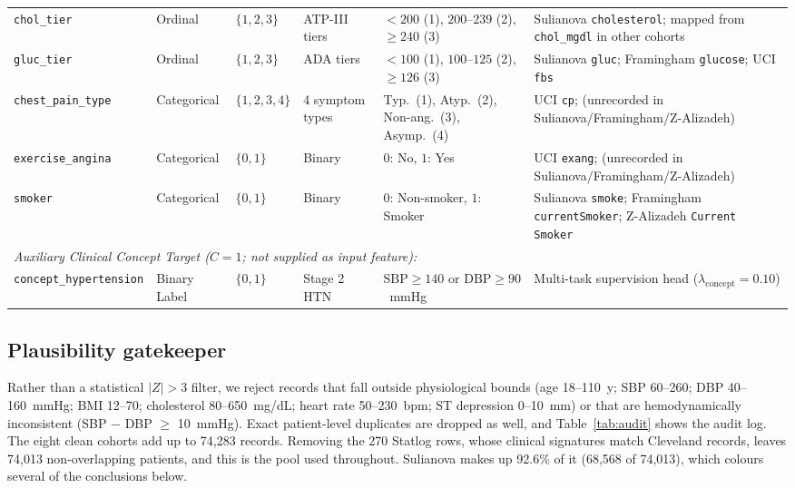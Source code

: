 \documentclass[conference]{IEEEtran}
\begin{document}
\begin{table}[t]
{\begin{tabular}{lllllp{4.6cm}}
\texttt{chol\_tier} & Ordinal & $\{1, 2, 3\}$ & ATP-III tiers & $<200$ (1), $200$--$239$ (2), $\ge 240$ (3) & Sulianova \texttt{cholesterol}; mapped from \texttt{chol\_mgdl} in other cohorts\\
\texttt{gluc\_tier} & Ordinal & $\{1, 2, 3\}$ & ADA tiers & $<100$ (1), $100$--$125$ (2), $\ge 126$ (3) & Sulianova \texttt{gluc}; Framingham \texttt{glucose}; UCI \texttt{fbs}\\
\texttt{chest\_pain\_type} & Categorical & $\{1, 2, 3, 4\}$ & 4 symptom types & Typ.\ (1), Atyp.\ (2), Non-ang.\ (3), Asymp.\ (4) & UCI \texttt{cp}; (unrecorded in Sulianova/Framingham/Z-Alizadeh)\\
\texttt{exercise\_angina} & Categorical & $\{0, 1\}$ & Binary & $0$: No, $1$: Yes & UCI \texttt{exang}; (unrecorded in Sulianova/Framingham/Z-Alizadeh)\\
\texttt{smoker} & Categorical & $\{0, 1\}$ & Binary & $0$: Non-smoker, $1$: Smoker & Sulianova \texttt{smoke}; Framingham \texttt{currentSmoker}; Z-Alizadeh \texttt{Current Smoker}\\
\midrule
\multicolumn{6}{l}{\emph{Auxiliary Clinical Concept Target ($C=1$; not supplied as input feature):}}\\
\texttt{concept\_hypertension} & Binary Label & $\{0, 1\}$ & Stage 2 HTN & $\mathrm{SBP}\ge 140$ or $\mathrm{DBP}\ge 90$~mmHg & Multi-task supervision head ($\lambda_{\mathrm{concept}}=0.10$)\\
\bottomrule
\end{tabular}}
\end{table}

\subsection{Plausibility gatekeeper}
Rather than a statistical $|Z|>3$ filter, we reject records that fall outside physiological bounds (age 18--110~y; SBP 60--260; DBP 40--160~mmHg; BMI 12--70; cholesterol 80--650~mg/dL; heart rate 50--230~bpm; ST depression 0--10~mm) or that are hemodynamically inconsistent (SBP $-$ DBP $\ge$ 10~mmHg). Exact patient-level duplicates are dropped as well, and Table~\ref{tab:audit} shows the audit log. The eight clean cohorts add up to 74{,}283 records. Removing the 270 Statlog rows, whose clinical signatures match Cleveland records, leaves 74{,}013 non-overlapping patients, and this is the pool used throughout. Sulianova makes up 92.6\% of it (68{,}568 of 74{,}013), which colours several of the conclusions below.
\end{document}
